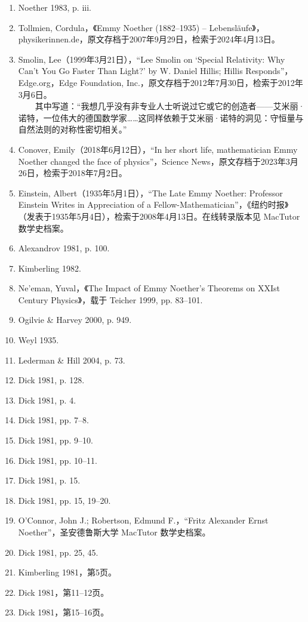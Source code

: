 \begin{enumerate}
\item Noether 1983, p. iii.
\item Tollmien, Cordula，《Emmy Noether (1882–1935) – Lebensläufe》，physikerinnen.de，原文存档于2007年9月29日，检索于2024年4月13日。
\item Smolin, Lee（1999年3月21日），“Lee Smolin on ‘Special Relativity: Why Can’t You Go Faster Than Light?’ by W. Daniel Hillis; Hillis Responds”，Edge.org，Edge Foundation, Inc.，原文存档于2012年7月30日，检索于2012年3月6日。\\
   　　其中写道：“我想几乎没有非专业人士听说过它或它的创造者——艾米丽·诺特，一位伟大的德国数学家……这同样依赖于艾米丽·诺特的洞见：守恒量与自然法则的对称性密切相关。”
\item Conover, Emily（2018年6月12日），“In her short life, mathematician Emmy Noether changed the face of physics”，Science News，原文存档于2023年3月26日，检索于2018年7月2日。
\item Einstein, Albert（1935年5月1日），“The Late Emmy Noether: Professor Einstein Writes in Appreciation of a Fellow-Mathematician”，《纽约时报》（发表于1935年5月4日），检索于2008年4月13日。在线转录版本见 MacTutor 数学史档案。
\item Alexandrov 1981, p. 100.
\item Kimberling 1982.
\item Ne'eman, Yuval，《The Impact of Emmy Noether's Theorems on XXIst Century Physics》，载于 Teicher 1999, pp. 83–101.
\item Ogilvie & Harvey 2000, p. 949.
\item Weyl 1935.
\item Lederman & Hill 2004, p. 73.
\item Dick 1981, p. 128.
\item Dick 1981, p. 4.
\item Dick 1981, pp. 7–8.
\item Dick 1981, pp. 9–10.
\item Dick 1981, pp. 10–11.
\item Dick 1981, p. 15.
\item Dick 1981, pp. 15, 19–20.
\item O'Connor, John J.; Robertson, Edmund F.，“Fritz Alexander Ernst Noether”，圣安德鲁斯大学 MacTutor 数学史档案。
\item Dick 1981, pp. 25, 45.
\item Kimberling 1981，第5页。
\item Dick 1981，第11–12页。
\item Dick 1981，第15–16页。

\end{enumerate}
